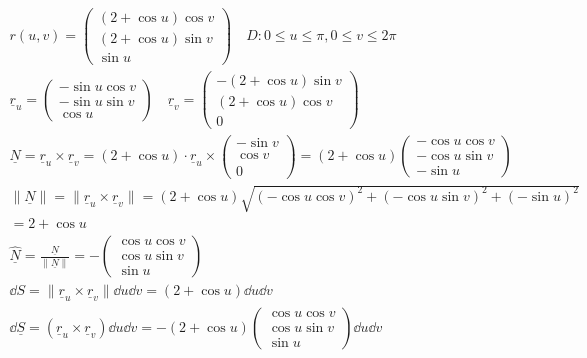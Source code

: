 \documentclass[00_complete]{sub files}
\begin{document}
\begin{example}
    \begin{gather*}
        r(u,v)=\begin{pmatrix}
            (2+\cos u) \cos v \\
            (2+\cos u) \sin v \\
            \sin u
        \end{pmatrix} \quad D: 0 \leq u \leq \pi, 0 \leq v \leq 2\pi \\
        \underline r_u=\begin{pmatrix}
            -\sin u \cos v \\ -\sin u \sin v \\ \cos u
        \end{pmatrix} \quad \underline r_v = \begin{pmatrix}
            -(2+\cos u)\sin v \\ (2+\cos u)\cos v \\ 0
        \end{pmatrix} \\
        \underline N = \underline r_u \times \underline r_v = (2+\cos u) \cdot \underline r_u
        \times \begin{pmatrix}
            -\sin v \\ \cos v \\ 0
        \end{pmatrix} = (2+\cos u )\begin{pmatrix}
            -\cos u \cos v \\ - \cos u \sin v \\ -\sin u
        \end{pmatrix} \\
        \|\underline N\|=\|\underline r_u \times \underline r_v\| = (2+\cos
        u)\sqrt{(-\cos u \cos v)^2 + (-\cos u \sin v)^2+(-\sin u)^2} \\
        =2+\cos u \\
        \underline{\hat N} = \frac{\underline N}{\|\underline N\|} =
        -\begin{pmatrix}
            \cos u \cos v \\ \cos u \sin v \\ \sin u
        \end{pmatrix} \\
        \dd{S} = \|\underline r_u \times\underline r_v\|\dd{u}\dd{v}=(2+\cos
        u)\dd{u}\dd{v} \\
        \dd{\underline S}= (\underline r_u \times \underline r_v)\dd{u}\dd{v} =
        -(2+\cos u)\begin{pmatrix}
            \cos u \cos v \\ \cos u \sin v \\ \sin u
        \end{pmatrix} \dd{u}\dd{v}
    \end{gather*}
\end{example}
\end{document}
